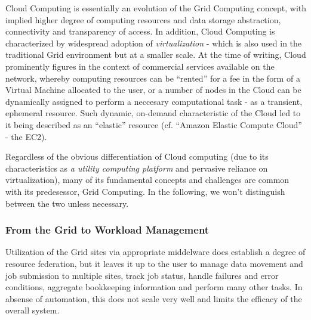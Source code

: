 Cloud Computing is essentially an evolution of the Grid Computing concept, with implied higher degree of computing resources and data storage abstraction, connectivity and transparency of access.
In addition, Cloud Computing is characterized by widespread adoption of \textit{virtualization} - which is also used in the traditional Grid environment but at a smaller scale.
At the time of writing, Cloud prominently figures in the context of commercial services available on the network, whereby computing resources can be ``rented'' for a fee in the form of a Virtual Machine allocated
to the user, or a  number of nodes in the Cloud can be dynamically assigned to perform a neccesary computational task - as a transient, ephemeral resource. Such dynamic, on-demand characteristic
of the Cloud led to it being described as an ``elastic'' resource (cf. ``Amazon Elastic Compute Cloud'' - the EC2).

Regardless of the obvious differentiation of Cloud computing (due to its characteristics as \textit{a utility computing platform} and pervasive reliance on virtualization), many of its fundamental concepts and challenges
are common with its predesessor, Grid Computing. In the following, we won't distinguish between the two unless  necessary.


%

\subsubsection{From the Grid to Workload Management}
\label{from_grid_to_workload}
Utilization of the Grid sites via appropriate middelware does establish a degree of resource federation, but it leaves it up to the user to manage data movement and job submission to multiple sites,
track job status, handle failures and error conditions, aggregate bookkeeping information and perform many other tasks. In absense of automation, this does not scale very well and limits the efficacy
of the overall system.

